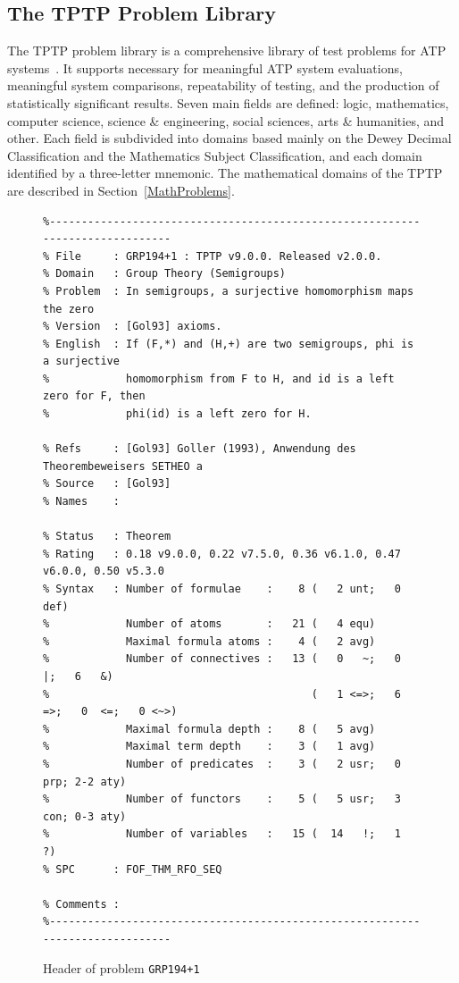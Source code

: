 \documentclass[runningheads]{llncs}
\begin{document}
\subsection{The TPTP Problem Library}
\label{TPTP}

The TPTP problem library is a comprehensive library of test problems for ATP systems~\cite{Sut09}.
It supports necessary for meaningful ATP system evaluations, meaningful system comparisons, 
repeatability of testing, and the production of statistically significant results. 
Seven main fields are defined: logic, mathematics, computer science, science \& engineering, 
social sciences, arts \& humanities, and other. 
Each field is subdivided into domains based mainly on the Dewey Decimal Classification and the 
Mathematics Subject Classification, and each domain identified by a three-letter mnemonic.
The mathematical domains of the TPTP are described in Section~\ref{MathProblems}.

\begin{figure}[htb]
\centering
{\scriptsize
{\setlength{\baselineskip}{2.5mm}
\begin{verbatim}
%------------------------------------------------------------------------------
% File     : GRP194+1 : TPTP v9.0.0. Released v2.0.0.
% Domain   : Group Theory (Semigroups)
% Problem  : In semigroups, a surjective homomorphism maps the zero
% Version  : [Gol93] axioms.
% English  : If (F,*) and (H,+) are two semigroups, phi is a surjective
%            homomorphism from F to H, and id is a left zero for F, then 
%            phi(id) is a left zero for H.

% Refs     : [Gol93] Goller (1993), Anwendung des Theorembeweisers SETHEO a
% Source   : [Gol93]
% Names    :

% Status   : Theorem
% Rating   : 0.18 v9.0.0, 0.22 v7.5.0, 0.36 v6.1.0, 0.47 v6.0.0, 0.50 v5.3.0
% Syntax   : Number of formulae    :    8 (   2 unt;   0 def)
%            Number of atoms       :   21 (   4 equ)
%            Maximal formula atoms :    4 (   2 avg)
%            Number of connectives :   13 (   0   ~;   0   |;   6   &)
%                                         (   1 <=>;   6  =>;   0  <=;   0 <~>)
%            Maximal formula depth :    8 (   5 avg)
%            Maximal term depth    :    3 (   1 avg)
%            Number of predicates  :    3 (   2 usr;   0 prp; 2-2 aty)
%            Number of functors    :    5 (   5 usr;   3 con; 0-3 aty)
%            Number of variables   :   15 (  14   !;   1   ?)
% SPC      : FOF_THM_RFO_SEQ

% Comments :
%------------------------------------------------------------------------------
\end{verbatim}
}}
\caption{Header of problem {\tt GRP194+1}}
\label{ExampleHeader}
\end{figure}
\end{document}
